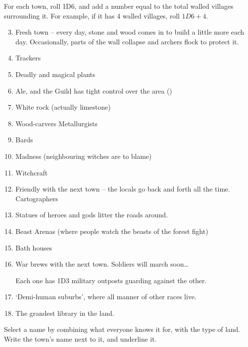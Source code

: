 \begin{multicols}{2}

For each town, roll 1D6, and add a number equal to the total walled villages surrounding it.
For example, if it has 4 walled villages, roll $1D6+4$.

\begin{multicols}{2}

\begin{enumerate}
\setcounter{enumi}{2}
  \item
  Fresh town -- every day, stone and wood comes in to build a little more each day.
  Occasionally, parts of the wall collapse and archers flock to protect it.
  \item
  Trackers
  \item
  Deadly and magical plants
  \item
  Ale, and the Guild has tight control over the area ()
  \item
  White rock (actually limestone)
  \item
  \ifodd\value{r4}
    Wood-carvers
  \else
    Metallurgists
  \fi
  \item
 Bards
  \item
  Madness (neighbouring witches are to blame)
  \item
  Witchcraft
  \item
  \ifodd\value{r4}
  Friendly with the next town -- the locals go back and forth all the
    time.
  \else
    Cartographers
  \fi
  \item
  Statues of heroes and gods litter the roads around.
  \item
  Beast Arenas (where people watch the beasts of the forest fight)
  \item
  Bath houses
  \item
  War brews with the next town.
  Soldiers will march soon\ldots

  Each one has 1D3 military outposts guarding against the other.
  \item
  `Demi-human suburbs', where all manner of other races live.
  \item
  The grandest library in the land.
\end{enumerate}

\end{multicols}


Select a name by combining what everyone knows it for, with the type of
land.
Write the town's name next to it, and underline it.


\end{multicols}
